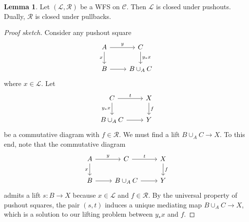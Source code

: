 \documentclass[10pt,letterpaper,cm]{nupset}
\theoremstyle{definition}
\theoremstyle{theorem}
\newtheorem{lemma}[definition]{Lemma}
\theoremstyle{remark}
\renewcommand{\L}{\mathcal L}
\newcommand{\RI}{\mathcal R}
\newcommand{\0}{\mathbf{0}}
\newcommand{\1}{\mathbf{1}}
\newcommand{\2}{\mathbf{2}}
\renewcommand{\c}{\mathscr{C}}
\begin{document}
\medskip

\begin{lemma}\label{CP}
Let $\left(\L, \RI\right)$ be a WFS on $\c$. Then $\L$ is closed under pushouts. Dually, $\RI$ is closed under pullbacks.
\end{lemma}
\begin{proof}[Proof sketch]
Consider any pushout square
\[
\begin{tikzcd}
A \arrow[d, "x"'] \arrow[r, "y"] & C \arrow[d, "y_{\ast}{x}"] \\
B \arrow[r]                      & B\cup_A C              
\end{tikzcd}
\] where $x\in \L$.  Let 
\[
\begin{tikzcd}
C \arrow[d, "y_{\ast}{x}"'] \arrow[r, "t"] & X \arrow[d, "f"] \\
B\cup_A C \arrow[r]                & Y               
\end{tikzcd}
\] be a commutative diagram with $f\in \RI$. We must find a lift $B\cup_A C \to X$. To this end, note that the commutative diagram
\[
\begin{tikzcd}
A \arrow[r, "y"] \arrow[d, "x"'] & C \arrow[r, "t"]         & X \arrow[d, "f"] \\
B \arrow[r]                      & B\cup_A C \arrow[r] & Y               
\end{tikzcd}
\] admits a lift  $s: B \to X$ because $x\in \L$ and $f\in \RI$. By the universal property of pushout squares, the pair $\left(s, t\right)$ induces a unique mediating map $B\cup_A C \to X$, which is a solution to our lifting problem between $y_{\ast}{x}$ and $f$.
\end{proof}
\end{document}
